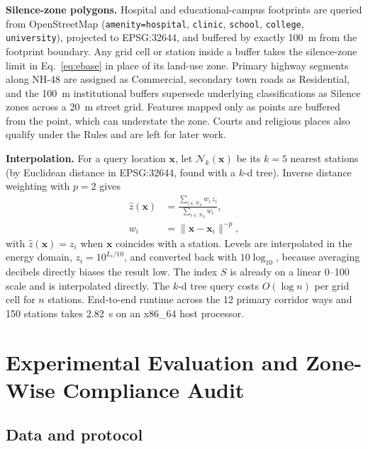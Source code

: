 \documentclass[conference]{IEEEtran}
\begin{document}
\textbf{Silence-zone polygons.} Hospital and educational-campus footprints are queried from OpenStreetMap (\texttt{amenity=hospital}, \texttt{clinic}, \texttt{school}, \texttt{college}, \texttt{university}), projected to EPSG:32644, and buffered by exactly 100~m from the footprint boundary. Any grid cell or station inside a buffer takes the silence-zone limit in Eq.~\eqref{eq:ebase} in place of its land-use zone. Primary highway segments along NH-48 are assigned as Commercial, secondary town roads as Residential, and the 100~m institutional buffers supersede underlying classifications as Silence zones across a 20~m street grid. Features mapped only as points are buffered from the point, which can understate the zone. Courts and religious places also qualify under the Rules \cite{cpcb2000} and are left for later work.

\textbf{Interpolation.} For a query location $\mathbf x$, let $\mathcal N_k(\mathbf x)$ be its $k=5$ nearest stations (by Euclidean distance in EPSG:32644, found with a $k$-d tree). Inverse distance weighting \cite{shepard} with $p=2$ gives
\begin{equation}
\begin{split}
\hat z(\mathbf x)&=\frac{\sum_{i\in\mathcal N_k}w_i\,z_i}{\sum_{i\in\mathcal N_k}w_i},\\
w_i&=\|\mathbf x-\mathbf x_i\|^{-p},
\end{split}
\label{eq:idw}
\end{equation}
with $\hat z(\mathbf x) = z_i$ when $\mathbf x$ coincides with a station. Levels are interpolated in the energy domain, $z_i = 10^{L_i/10}$, and converted back with $10\log_{10}$, because averaging decibels directly biases the result low. The index $S$ is already on a linear 0--100 scale and is interpolated directly. The $k$-d tree query costs $O(\log n)$ per grid cell for $n$ stations. End-to-end runtime across the 12 primary corridor ways and 150 stations takes 2.82~s on an x86\_64 host processor.

\section{Experimental Evaluation and Zone-Wise Compliance Audit}
\label{sec:eval}

\subsection{Data and protocol}
\end{document}
